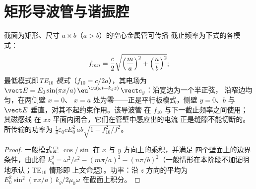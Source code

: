 \section{矩形导波管与谐振腔}

\begin{proposition}[矩形导波管；TE$_{10}$ 模式]\label{prop:b2:guided-waves:rectangular}
截面为矩形、尺寸 $a \times b$（$a > b$）的空心金属管可传播
截止频率为下式的各模式：
\[
f_{mn} = \frac c2\sqrt{\Bigl(\frac ma\Bigr)^2 + \Bigl(\frac nb\Bigr)^2} ;
\]
最低模式即\emph{TE$_{10}$ 模式}（$f_{10} = c/2a$），其电场为 $\vect E = E_0\sin
(\pi x/a)\,\eu^{\iu(\omega t - k_gz)}\,\vect e_y$：沿宽边为一个半正弦，
沿窄边均匀，在两侧壁 $x = 0$、
$x = a$ 处为零——正是平行板模式，侧壁 $y = 0$、$b$
与 $\vect E$ 垂直，对其不起约束作用。该导波管
在 $f_{10}$ 与下一截止频率之间使用；其磁感线
在 $xz$ 平面内闭合，它们在管壁中感应出的电流
正是缝隙不能切断的。所传输的功率为 $\tfrac14\varepsilon_0cE_0^2\,ab
\sqrt{1 - f_{10}^2/f^2}$。
\end{proposition}

\begin{proof}
一般模式是 $\cos$/$\sin$ 在 $x$ 与 $y$ 方向上的乘积，并满足
四个壁面上的边界条件，由此得 $k_g^2 = \omega^2/c^2 - (m\pi/a)^2
- (n\pi/b)^2$（一般情形在本阶段不加证明地承认；TE$_{10}$ 情形即
上文命题）。功率：沿 $z$ 方向的平均为 $E_0^2\sin^2(\pi x/a)
\,k_g/2\mu_0\omega$ 在截面上积分。
\end{proof}

